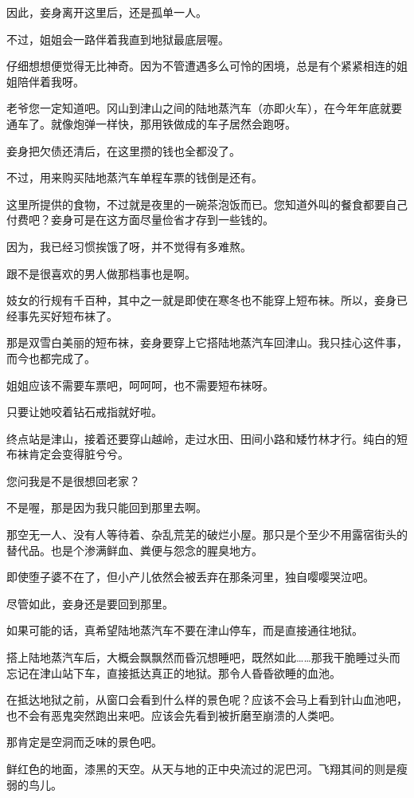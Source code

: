 \documentclass[portrait,a4paper]{article}
\begin{document}
因此，妾身离开这里后，还是孤单一人。

不过，姐姐会一路伴着我直到地狱最底层喔。

仔细想想便觉得无比神奇。因为不管遭遇多么可怜的困境，总是有个紧紧相连的姐姐陪伴着我呀。

老爷您一定知道吧。冈山到津山之间的陆地蒸汽车（亦即火车），在今年年底就要通车了。就像炮弹一样快，那用铁做成的车子居然会跑呀。

妾身把欠债还清后，在这里攒的钱也全都没了。

不过，用来购买陆地蒸汽车单程车票的钱倒是还有。

这里所提供的食物，不过就是夜里的一碗茶泡饭而已。您知道外叫的餐食都要自己付费吧？妾身可是在这方面尽量俭省才存到一些钱的。

因为，我已经习惯挨饿了呀，并不觉得有多难熬。

跟不是很喜欢的男人做那档事也是啊。

妓女的行规有千百种，其中之一就是即使在寒冬也不能穿上短布袜。所以，妾身已经事先买好短布袜了。

那是双雪白美丽的短布袜，妾身要穿上它搭陆地蒸汽车回津山。我只挂心这件事，而今也都完成了。

姐姐应该不需要车票吧，呵呵呵，也不需要短布袜呀。

只要让她咬着钻石戒指就好啦。

终点站是津山，接着还要穿山越岭，走过水田、田间小路和矮竹林才行。纯白的短布袜肯定会变得脏兮兮。

您问我是不是很想回老家？

不是喔，那是因为我只能回到那里去啊。

那空无一人、没有人等待着、杂乱荒芜的破烂小屋。那只是个至少不用露宿街头的替代品。也是个渗满鲜血、粪便与怨念的腥臭地方。

即使堕子婆不在了，但小产儿依然会被丢弃在那条河里，独自嘤嘤哭泣吧。

尽管如此，妾身还是要回到那里。

如果可能的话，真希望陆地蒸汽车不要在津山停车，而是直接通往地狱。

搭上陆地蒸汽车后，大概会飘飘然而昏沉想睡吧，既然如此……那我干脆睡过头而忘记在津山站下车，直接抵达真正的地狱。那令人昏昏欲睡的血池。

在抵达地狱之前，从窗口会看到什么样的景色呢？应该不会马上看到针山血池吧，也不会有恶鬼突然跑出来吧。应该会先看到被折磨至崩溃的人类吧。

那肯定是空洞而乏味的景色吧。

鲜红色的地面，漆黑的天空。从天与地的正中央流过的泥巴河。飞翔其间的则是瘦弱的鸟儿。
\end{document}
